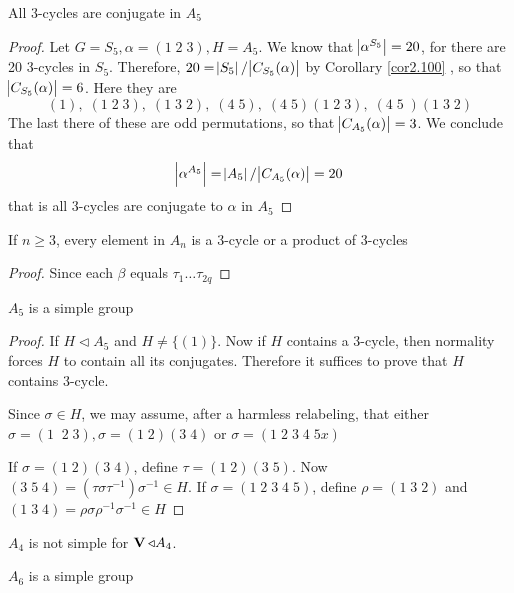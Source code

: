 \documentclass[11pt]{article}
\begin{document}
\begin{lemma}[]
All 3-cycles are conjugate in \(A_5\)
\end{lemma}

\begin{proof}
Let \(G=S_5,\alpha=(1\; 2\;3), H=A_5\). We know that \(\abs{\alpha^{S_5}}=20\), for there
are 20 3-cycles in \(S_5\). Therefore, \(20=\abs{S_5}/\abs{C_{S_5}(\alpha)}\) by
Corollary \ref{cor2.100} , so that \(\abs{C_{S_5}(\alpha)}=6\). Here they are
\begin{equation*}
(1),\;(1\;2\;3),\;(1\;3\;2),\;(4\;5),\;(4\;5)(1\;2\;3),\;(4\;5\;)(1\;3\;2)
\end{equation*}
The last there of these are odd permutations, so that \(\abs{C_{A_5}(\alpha)}=3\). We
conclude that
\begin{equation*}
\abs{\alpha^{A_5}}=\abs{A_5}/\abs{C_{A_5}(\alpha)}=20
\end{equation*}
that is all 3-cycles are conjugate to \(\alpha\) in \(A_5\)
\end{proof}

\begin{lemma}[]
\label{lemma2.109}
If \(n\ge 3\), every element in \(A_n\) is a 3-cycle or a product of 3-cycles
\end{lemma}
\begin{proof}
Since each \(\beta\) equals \(\tau_1\dots\tau_{2q}\)
\end{proof}

\begin{theorem}[]
\(A_5\) is a simple group
\end{theorem}
\begin{proof}
If \(H\triangleleft A_5\) and \(H\neq\{(1)\}\). Now if \(H\) contains a 3-cycle, then
normality forces \(H\) to contain all its conjugates. Therefore it suffices to
prove that \(H\) contains 3-cycle.

Since \(\sigma\in H\), we may assume, after a harmless relabeling, that either
\(\sigma=(1\;\;2\;3),\sigma=(1\;2)(3\;4)\) or \(\sigma=(1\;2\;3\;4\;5x)\)

If \(\sigma=(1\;2)(3\;4)\), define \(\tau=(1\;2)(3\;5)\). Now
\((3\;5\;4)=(\tau\sigma\tau^{-1})\sigma^{-1}\in H\). If \(\sigma=(1\;2\;3\;4\;5)\),
define \(\rho=(1\;3\;2)\) and \((1\;3\;4)=\rho\sigma\rho^{-1}\sigma^{-1}\in H\)
\end{proof}

\(A_4\) is not simple for \(\operatorname{\textbf{V}}\triangleleft A_4\).

\begin{lemma}[]
\(A_6\) is a simple group
\end{lemma}
\end{document}
